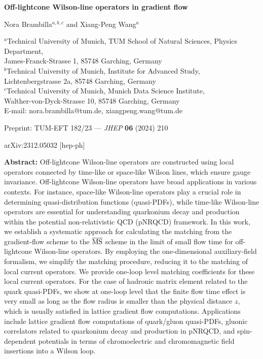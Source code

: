 \documentclass[11pt]{article}
\begin{document}
\begin{center}
{\LARGE\bfseries Off-lightcone Wilson-line operators in gradient flow\par}
\vspace{1.2em}
{\large Nora Brambilla$^{a,b,c}$ and Xiang-Peng Wang$^{a}$\par}
\vspace{0.8em}
{\small
$^{a}$Technical University of Munich, TUM School of Natural Sciences, Physics Department,\\
James-Franck-Strasse 1, 85748 Garching, Germany\\[3pt]
$^{b}$Technical University of Munich, Institute for Advanced Study,\\ Lichtenbergstrasse 2a, 85748 Garching, Germany\\[3pt]
$^{c}$Technical University of Munich, Munich Data Science Institute,\\ Walther-von-Dyck-Strasse 10, 85748 Garching, Germany\\[6pt]
E-mail: nora.brambilla@tum.de, xiangpeng.wang@tum.de\par}
\vspace{0.8em}
{\small Preprint: TUM-EFT 182/23 --- \emph{JHEP} {\bfseries 06} (2024) 210\par}
{\small arXiv:2312.05032 [hep-ph]\par}
\end{center}

\vspace{1em}

\noindent\textbf{Abstract:} Off-lightcone Wilson-line operators are constructed using local operators connected by time-like or space-like Wilson lines, which ensure gauge invariance. Off-lightcone Wilson-line operators have broad applications in various contexts. For instance, space-like Wilson-line operators play a crucial role in determining quasi-distribution functions (quasi-PDFs), while time-like Wilson-line operators are essential for understanding quarkonium decay and production within the potential non-relativistic QCD (pNRQCD) framework.
In this work, we establish a systematic approach for calculating the matching from the gradient-flow scheme to the $\overline{\rm MS}$ scheme in the limit of small flow time for off-lightcone Wilson-line operators. By employing the one-dimensional auxiliary-field formalism, we simplify the matching procedure, reducing it to the matching of local current operators. We provide one-loop level matching coefficients for these local current operators.
For the case of hadronic matrix element related to the quark quasi-PDFs, we show at one-loop level that the finite flow time effect is very small as long as the flow radius is smaller than the physical distance $z$, which is usually satisfied in lattice gradient flow computations.
Applications include lattice gradient flow computations of quark/gluon quasi-PDFs, gluonic correlators related to quarkonium decay and production in pNRQCD, and spin-dependent potentials in terms of chromoelectric and chromomagnetic field insertions into a Wilson loop.

\vspace{1.5em}







\end{document}

